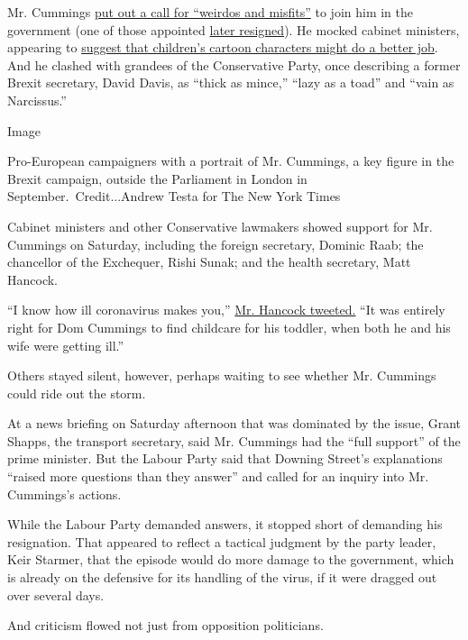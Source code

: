 Mr. Cummings
\href{https://www.nytimes3xbfgragh.onion/2020/03/07/world/europe/boris-johnson-dominic-cummings-civil-service.html}{put
out a call for ``weirdos and misfits''} to join him in the government
(one of those appointed
\href{https://www.nytimes3xbfgragh.onion/2020/02/17/world/europe/boris-johnson-andrew-sabisky-dominic-cummings.html}{later
resigned}). He mocked cabinet ministers, appearing to
\href{https://www.thesun.co.uk/news/10944057/dominic-cummings-cabinet-pj-masks/}{suggest
that children's cartoon characters might do a better job}. And he
clashed with grandees of the Conservative Party, once describing a
former Brexit secretary, David Davis, as ``thick as mince,'' ``lazy as a
toad'' and ``vain as Narcissus.''

Image

Pro-European campaigners with a portrait of Mr. Cummings, a key figure
in the Brexit campaign, outside the Parliament in London in
September.~Credit...Andrew Testa for The New York Times

Cabinet ministers and other Conservative lawmakers showed support for
Mr. Cummings on Saturday, including the foreign secretary, Dominic Raab;
the chancellor of the Exchequer, Rishi Sunak; and the health secretary,
Matt Hancock.

``I know how ill coronavirus makes you,''
\href{https://twitter.com/MattHancock/status/1264162359733555202}{Mr.
Hancock tweeted.} ``It was entirely right for Dom Cummings to find
childcare for his toddler, when both he and his wife were getting ill.''

Others stayed silent, however, perhaps waiting to see whether Mr.
Cummings could ride out the storm.

At a news briefing on Saturday afternoon that was dominated by the
issue, Grant Shapps, the transport secretary, said Mr. Cummings had the
``full support'' of the prime minister. But the Labour Party said that
Downing Street's explanations ``raised more questions than they answer''
and called for an inquiry into Mr. Cummings's actions.

While the Labour Party demanded answers, it stopped short of demanding
his resignation. That appeared to reflect a tactical judgment by the
party leader, Keir Starmer, that the episode would do more damage to the
government, which is already on the defensive for its handling of the
virus, if it were dragged out over several days.

And criticism flowed not just from opposition politicians.

